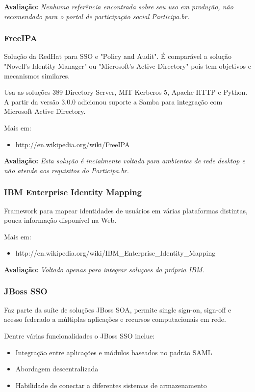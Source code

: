 \documentclass[11pt]{article}
\begin{document}
{\bf Avaliação:} {\it Nenhuma referência encontrada sobre seu uso em produção,
não recomendado para o portal de participação social Participa.br.}

\subsubsection{FreeIPA}

Solução da RedHat para SSO e "Policy and Audit". É comparável a solução
"Novell's Identity Manager" ou "Microsoft's Active Directory" pois tem
objetivos e mecanismos similares.

Usa as soluções 389 Directory Server, MIT Kerberos 5, Apache HTTP e Python. A
partir da versão 3.0.0 adicionou suporte a Samba para integração com Microsoft
Active Directory.

Mais em:
\begin{itemize}
  \item{http://en.wikipedia.org/wiki/FreeIPA}
\end{itemize}

{\bf Avaliação:} {\it Esta solução é incialmente voltada para ambientes de
rede desktop e não atende aos requisitos do Participa.br.}

\subsubsection{IBM Enterprise Identity Mapping}

Framework para mapear identidades de usuários em várias plataformas distintas,
pouca informação disponível na Web.

Mais em:
\begin{itemize}
  \item{http://en.wikipedia.org/wiki/IBM\_Enterprise\_Identity\_Mapping}
\end{itemize}

{\bf Avaliação:} {\it Voltado apenas para integrar soluçoes da própria
IBM.}

\subsubsection{JBoss SSO}

Faz parte da suíte de soluções JBoss SOA, permite single sign-on, sign-off e
acesso federado a múltiplas aplicações e recursos computacionais em rede.

Dentre várias funcionalidades o JBoss SSO inclue:

\begin{itemize}
  \item{Integração entre aplicações e módulos baseados no padrão SAML}
  \item{Abordagem descentralizada}
  \item{Habilidade de conectar a diferentes sistemas de armazenamento}
\end{itemize}
\end{document}
